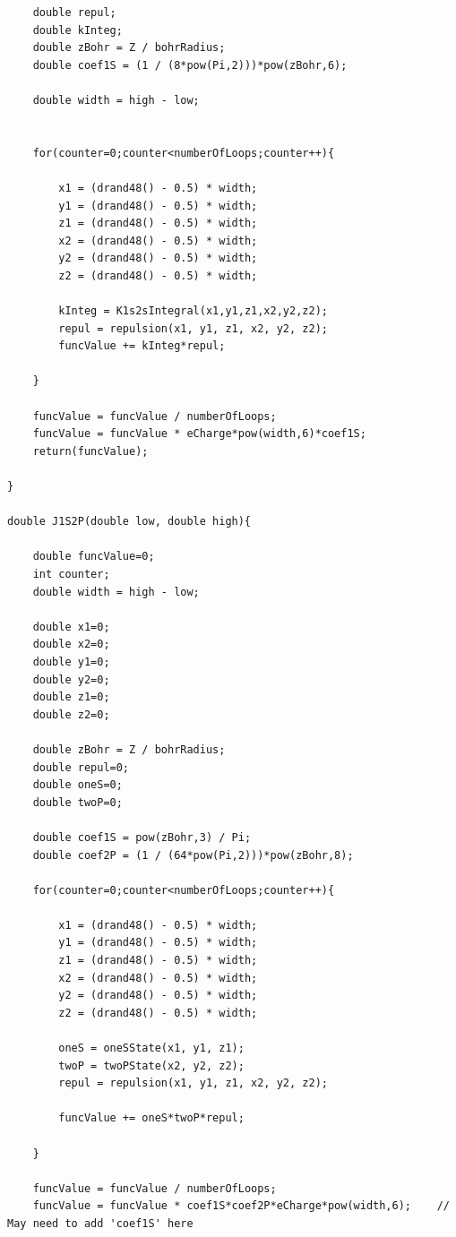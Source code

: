\documentclass[12pt]{article}
\begin{document}
\begin{verbatim}
    double repul;
    double kInteg;
    double zBohr = Z / bohrRadius;
    double coef1S = (1 / (8*pow(Pi,2)))*pow(zBohr,6);
    
    double width = high - low;
    
    
    for(counter=0;counter<numberOfLoops;counter++){
        
        x1 = (drand48() - 0.5) * width;
        y1 = (drand48() - 0.5) * width;
        z1 = (drand48() - 0.5) * width;
        x2 = (drand48() - 0.5) * width;
        y2 = (drand48() - 0.5) * width;
        z2 = (drand48() - 0.5) * width;
        
        kInteg = K1s2sIntegral(x1,y1,z1,x2,y2,z2);
        repul = repulsion(x1, y1, z1, x2, y2, z2);
        funcValue += kInteg*repul;
        
    }
    
    funcValue = funcValue / numberOfLoops;
    funcValue = funcValue * eCharge*pow(width,6)*coef1S;
    return(funcValue);
    
}

double J1S2P(double low, double high){
    
    double funcValue=0;
    int counter;
    double width = high - low;
    
    double x1=0;
    double x2=0;
    double y1=0;
    double y2=0;
    double z1=0;
    double z2=0;
    
    double zBohr = Z / bohrRadius;
    double repul=0;
    double oneS=0;
    double twoP=0;
    
    double coef1S = pow(zBohr,3) / Pi;
    double coef2P = (1 / (64*pow(Pi,2)))*pow(zBohr,8);
    
    for(counter=0;counter<numberOfLoops;counter++){
        
        x1 = (drand48() - 0.5) * width;
        y1 = (drand48() - 0.5) * width;
        z1 = (drand48() - 0.5) * width;
        x2 = (drand48() - 0.5) * width;
        y2 = (drand48() - 0.5) * width;
        z2 = (drand48() - 0.5) * width;
     
        oneS = oneSState(x1, y1, z1);
        twoP = twoPState(x2, y2, z2);
        repul = repulsion(x1, y1, z1, x2, y2, z2);
        
        funcValue += oneS*twoP*repul;
        
    }
    
    funcValue = funcValue / numberOfLoops;
    funcValue = funcValue * coef1S*coef2P*eCharge*pow(width,6);    // May need to add 'coef1S' here
    

\end{verbatim}
\end{document}
